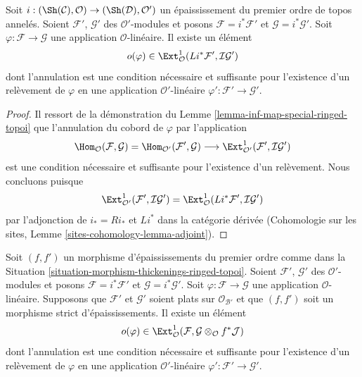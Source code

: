 \begin{lemma}
\label{lemma-inf-obs-map-special-ringed-topoi}
Soit $i : (\Sh(\mathcal{C}), \mathcal{O}) \to (\Sh(\mathcal{D}), \mathcal{O}')$
un épaississement du premier ordre de topos annelés.
Soient $\mathcal{F}'$, $\mathcal{G}'$ des $\mathcal{O}'$-modules et posons
$\mathcal{F} = i^*\mathcal{F}'$ et $\mathcal{G} = i^*\mathcal{G}'$.
Soit $\varphi : \mathcal{F} \to \mathcal{G}$ une application
$\mathcal{O}$-linéaire.
Il existe un élément
$$
o(\varphi) \in
\Ext^1_\mathcal{O}(Li^*\mathcal{F}', \mathcal{I}\mathcal{G}')
$$
dont l'annulation est une condition nécessaire et suffisante pour l'existence
d'un relèvement de $\varphi$ en une application $\mathcal{O}'$-linéaire
$\varphi' : \mathcal{F}' \to \mathcal{G}'$.
\end{lemma}

\begin{proof}
Il ressort de la démonstration du
Lemme \ref{lemma-inf-map-special-ringed-topoi} que l'annulation du cobord de
$\varphi$ par l'application
$$
\Hom_\mathcal{O}(\mathcal{F}, \mathcal{G}) =
\Hom_{\mathcal{O}'}(\mathcal{F}', \mathcal{G}) \longrightarrow
\Ext^1_{\mathcal{O}'}(\mathcal{F}', \mathcal{I}\mathcal{G}')
$$
est une condition nécessaire et suffisante pour l'existence d'un relèvement.
Nous concluons puisque
$$
\Ext^1_{\mathcal{O}'}(\mathcal{F}', \mathcal{I}\mathcal{G}') =
\Ext^1_\mathcal{O}(Li^*\mathcal{F}', \mathcal{I}\mathcal{G}')
$$
par l'adjonction de $i_* = Ri_*$ et $Li^*$ dans la catégorie dérivée
(Cohomologie sur les sites, Lemme \ref{sites-cohomology-lemma-adjoint}).
\end{proof}

\begin{lemma}
\label{lemma-inf-obs-map-rel-ringed-topoi}
Soit $(f, f')$ un morphisme d'épaississements du premier ordre comme dans la
Situation \ref{situation-morphism-thickenings-ringed-topoi}.
Soient $\mathcal{F}'$, $\mathcal{G}'$ des $\mathcal{O}'$-modules et posons
$\mathcal{F} = i^*\mathcal{F}'$ et $\mathcal{G} = i^*\mathcal{G}'$.
Soit $\varphi : \mathcal{F} \to \mathcal{G}$ une application
$\mathcal{O}$-linéaire.
Supposons que $\mathcal{F}'$ et $\mathcal{G}'$ soient plats sur
$\mathcal{O}_{\mathcal{B}'}$ et que $(f, f')$ soit un morphisme strict
d'épaississements. Il existe un élément
$$
o(\varphi) \in
\Ext^1_\mathcal{O}(\mathcal{F},
\mathcal{G} \otimes_\mathcal{O} f^*\mathcal{J})
$$
dont l'annulation est une condition nécessaire et suffisante pour l'existence
d'un relèvement de $\varphi$ en une application $\mathcal{O}'$-linéaire
$\varphi' : \mathcal{F}' \to \mathcal{G}'$.
\end{lemma}

